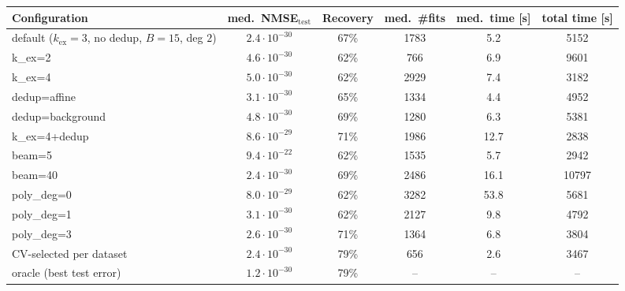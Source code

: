 \begin{tabular}{lccccc}
\toprule
Configuration & med.\ NMSE$_{\mathrm{test}}$ & Recovery & med.\ \#fits & med.\ time [s] & total time [s] \\
\midrule
default ($k_{\mathrm{ex}}{=}3$, no dedup, $B{=}15$, deg $2$) & $2.4\!\cdot\!10^{-30}$ & 67\% & 1783 & 5.2 & 5152 \\
k\_ex=2 & $4.6\!\cdot\!10^{-30}$ & 62\% & 766 & 6.9 & 9601 \\
k\_ex=4 & $5.0\!\cdot\!10^{-30}$ & 62\% & 2929 & 7.4 & 3182 \\
dedup=affine & $3.1\!\cdot\!10^{-30}$ & 65\% & 1334 & 4.4 & 4952 \\
dedup=background & $4.8\!\cdot\!10^{-30}$ & 69\% & 1280 & 6.3 & 5381 \\
k\_ex=4+dedup & $8.6\!\cdot\!10^{-29}$ & 71\% & 1986 & 12.7 & 2838 \\
beam=5 & $9.4\!\cdot\!10^{-22}$ & 62\% & 1535 & 5.7 & 2942 \\
beam=40 & $2.4\!\cdot\!10^{-30}$ & 69\% & 2486 & 16.1 & 10797 \\
poly\_deg=0 & $8.0\!\cdot\!10^{-29}$ & 62\% & 3282 & 53.8 & 5681 \\
poly\_deg=1 & $3.1\!\cdot\!10^{-30}$ & 62\% & 2127 & 9.8 & 4792 \\
poly\_deg=3 & $2.6\!\cdot\!10^{-30}$ & 71\% & 1364 & 6.8 & 3804 \\
\midrule
CV-selected per dataset & $2.4\!\cdot\!10^{-30}$ & 79\% & 656 & 2.6 & 3467 \\
oracle (best test error) & $1.2\!\cdot\!10^{-30}$ & 79\% & -- & -- & -- \\
\bottomrule
\end{tabular}